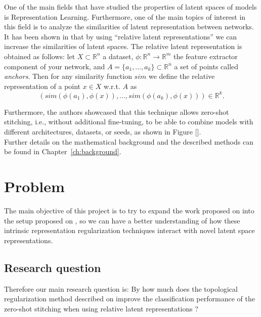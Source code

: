 \documentclass[../main.tex]{subfiles}
\begin{document}
One of the main fields that have studied the properties of latent spaces of  models is Representation Learning. Furthermore, one of the main topics of interest in this field is to analyze the similarities of latent representation between networks. It has been shown in \cite{moschella_relative_2022} that by using ``relative latent representations'' we can increase the similarities of latent spaces. The relative latent representation is obtained as follows: let $X\subset\mathbb{R}^n$ a dataset, $\phi: \mathbb{R}^n \to \mathbb{R}^m$ the feature extractor component of your network, and $A=\{a_1, ..., a_k\}\subset\mathbb{R}^n$ a set of points called \textit{anchors}. Then for any similarity function $sim$ we define the relative representation  of a point $x\in X$  w.r.t. $A$ as
\[
(sim(\phi(a_1), \phi(x)), ..., sim(\phi(a_k), \phi(x)))\in \mathbb{R}^k.
\]

Furthermore, the authors showcased that this technique allows zero-shot stitching, i.e., without additional fine-tuning, to be able to combine models with different architectures, datasets, or seeds, as shown in Figure [].\\

Further details on the mathematical background and the described methods can be found in Chapter~\ref{ch:background}.

\section{Problem}
\label{sec:problem}


The main objective of this project is to try to expand the work proposed on \cite{hofer_densified_2021} into the setup proposed on \cite{moschella_relative_2022}, so we can have a better understanding of how these intrinsic representation regularization techniques interact with novel latent space representations.

\subsection{Research question}
\label{sec:researchQuestion}

Therefore our main research question is: By how much does the topological regularization method described on \cite{hofer_densified_2021} improve the classification performance of the zero-shot stitching when using relative latent representations \cite{moschella_relative_2022}?
\end{document}
